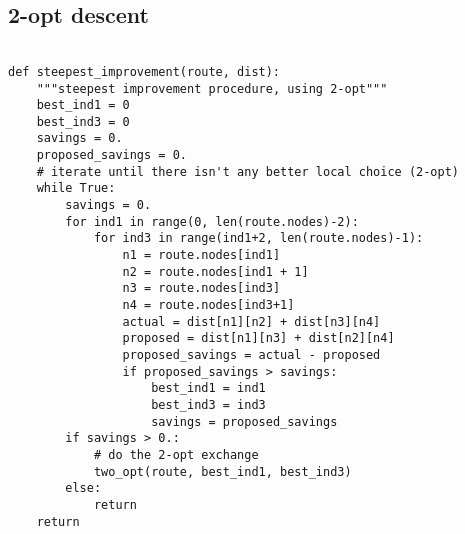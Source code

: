 \documentclass{article} %
\begin{document}
\subsection{2-opt descent}
\label{code_steepest_improvement}
\begin{verbatim}

def steepest_improvement(route, dist):
    """steepest improvement procedure, using 2-opt"""
    best_ind1 = 0
    best_ind3 = 0
    savings = 0.
    proposed_savings = 0.
    # iterate until there isn't any better local choice (2-opt)
    while True:
        savings = 0.
        for ind1 in range(0, len(route.nodes)-2):
            for ind3 in range(ind1+2, len(route.nodes)-1):
                n1 = route.nodes[ind1]
                n2 = route.nodes[ind1 + 1]
                n3 = route.nodes[ind3]
                n4 = route.nodes[ind3+1]
                actual = dist[n1][n2] + dist[n3][n4]
                proposed = dist[n1][n3] + dist[n2][n4]
                proposed_savings = actual - proposed
                if proposed_savings > savings:
                    best_ind1 = ind1
                    best_ind3 = ind3
                    savings = proposed_savings
        if savings > 0.:
        	# do the 2-opt exchange
            two_opt(route, best_ind1, best_ind3)
        else:
            return
    return
\end{verbatim}
\end{document}
